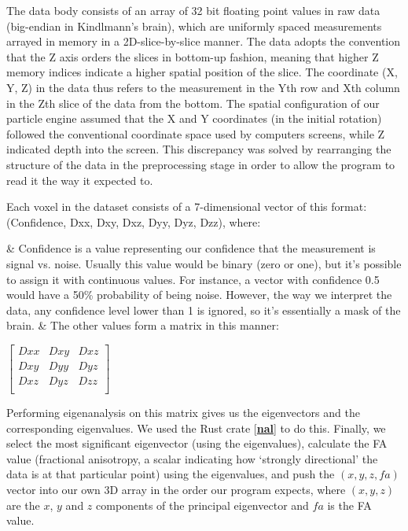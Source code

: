 \documentclass{article}
\newcommand{\code}[1]{\fcolorbox{codebd}{codebg}{\lstinline[basicstyle=\ttfamily\color{codefg}]{#1}}}
\newcommand{\reference}[1]{[\hyperref[ref:#1]{\textbf{#1}}]}
\begin{document}
The data body consists of an array of 32 bit floating point values in raw data (big-endian in Kindlmann's brain), which are uniformly spaced measurements arrayed in memory in a 2D-slice-by-slice manner. The data adopts the convention that the Z axis orders the slices in bottom-up fashion, meaning that higher Z memory indices indicate a higher spatial position of the slice. The coordinate (X, Y, Z) in the data thus refers to the measurement in the Yth row and Xth column in the Zth slice of the data from the bottom. The spatial configuration of our particle engine assumed that the X and Y coordinates (in the initial rotation) followed the conventional coordinate space used by computers screens, while Z indicated depth into the screen. This discrepancy was solved by rearranging the structure of the data in the preprocessing stage in order to allow the program to read it the way it expected to.

Each voxel in the dataset consists of a 7-dimensional vector of this format: (Confidence, Dxx, Dxy, Dxz, Dyy, Dyz, Dzz), where:
\begin{easylist}[itemize]
& Confidence is a value representing our confidence that the measurement is signal vs. noise. Usually this value would be binary (zero or one), but it's possible to assign it with continuous values. For instance, a vector with confidence 0.5 would have a 50\% probability of being noise. However, the way we interpret the data, any confidence level lower than 1 is ignored, so it's essentially a mask of the brain.
& The other values form a matrix in this manner:
\end{easylist}

\hspace{1cm}
$\begin{bmatrix}
    Dxx & Dxy & Dxz \\
    Dxy & Dyy & Dyz \\
    Dxz & Dyz & Dzz \\
\end{bmatrix}$

Performing eigenanalysis on this matrix gives us the eigenvectors and the corresponding eigenvalues. We used the Rust crate \code{nalgebra} \reference{nal} to do this. Finally, we select the most significant eigenvector (using the eigenvalues), calculate the FA value (fractional anisotropy, a scalar indicating how `strongly directional' the data is at that particular point) using the eigenvalues, and push the $(x, y, z, fa)$ vector into our own 3D array in the order our program expects, where $(x, y, z)$ are the $x$, $y$ and $z$ components of the principal eigenvector and $fa$ is the FA value.
\end{document}
